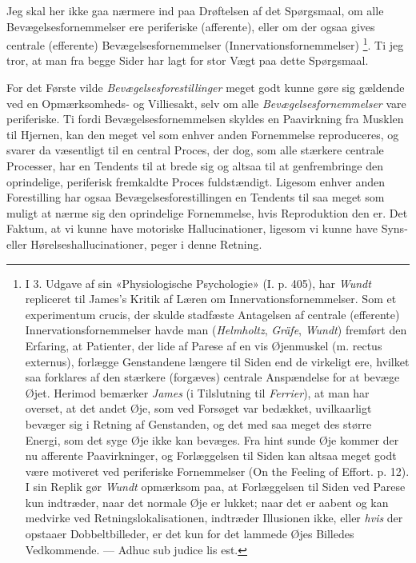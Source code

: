 \documentclass[12pt,a4paper,openany]{book}
\newcommand{\opage}[1]{\marginnote{\footnotesize\textit{[#1]}}}
\begin{document}
Jeg skal her ikke gaa nærmere ind paa Drøftelsen af det Spørgsmaal, om alle
Bevægelsesfornemmelser ere periferiske (afferente), eller om der ogsaa gives
centrale (efferente) Bevægelsesfornemmelser (Innervationsfornemmelser)%
\footnote[1]{I 3. Udgave af sin «Physiologische Psychologie» (I. p. 405), har
\emph{Wundt} repliceret til James's Kritik af Læren om
Innervationsfornemmelser. Som et experimentum crucis, der skulde stadfæste
Antagelsen af centrale (efferente) Innervationsfornemmelser havde man
(\emph{Helmholtz}, \emph{Gräfe}, \emph{Wundt}) fremført den Erfaring, at
Patienter, der lide af Parese af en vis Øjenmuskel (m. rectus externus),
forlægge Genstandene længere til Siden end de virkeligt ere, hvilket saa
forklares af den stærkere (forgæves) centrale Anspændelse for at bevæge Øjet.
Herimod bemærker \emph{James} (i Tilslutning til \emph{Ferrier}), at man har
overset, at det andet Øje, som ved Forsøget var bedækket, uvilkaarligt bevæger
sig i Retning af Genstanden, og det med saa meget des større Energi, som det
syge Øje ikke kan bevæges. Fra hint sunde Øje kommer der nu afferente
Paavirkninger, og Forlæggelsen til Siden kan altsaa meget godt være motiveret
ved periferiske Fornemmelser (On the Feeling of Effort. p. 12). I sin Replik
gør \emph{Wundt} opmærksom paa, at Forlæggelsen til Siden ved Parese kun
indtræder, naar det normale Øje er lukket; naar det er aabent og kan medvirke
ved Retningslokalisationen, indtræder Illusionen ikke, eller \emph{hvis} der
opstaaer Dobbeltbilleder, er det kun for det lammede Øjes Billedes Vedkommende.
--- Adhuc sub judice lis est.}. Ti jeg tror, at man fra begge Sider har lagt
for stor Vægt paa dette Spørgsmaal.

For det Første vilde \emph{Bevægelsesforestillinger} meget godt kunne gøre sig
gældende ved en Opmærksomheds- og Villiesakt, selv om alle
\emph{Bevægelsesfornemmelser} vare periferiske. Ti fordi Bevægelsesfornemmelsen
skyldes en Paavirkning fra Musklen til Hjernen, kan den meget vel som enhver
anden Fornemmelse reproduceres, og svarer da væsentligt til en central Proces,
der dog, som alle stærkere centrale Processer, har en Tendents til at brede sig
og altsaa til at genfrembringe den oprindelige, periferisk fremkaldte Proces
fuldstændigt. Ligesom enhver anden Forestilling har ogsaa
Bevægelsesforestillingen en Tendents til saa meget som muligt at nærme sig den
oprindelige Fornemmelse,
\setcounter{footnote}{0}%
\opage{72}hvis Reproduktion den er. Det Faktum, at vi kunne have motoriske
Hallucinationer, ligesom vi kunne have Syns- eller Hørelseshallucinationer,
peger i denne Retning.
\end{document}
